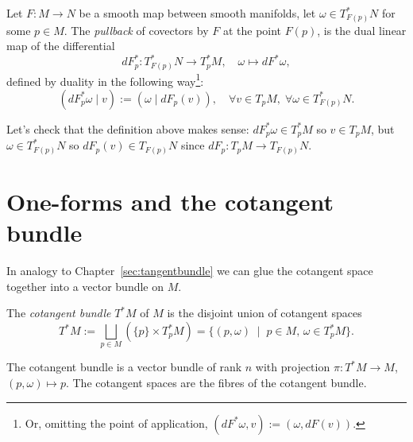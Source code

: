 \begin{definition}\label{def:pullback:oneform}
  Let $F:M\to N$ be a smooth map between smooth manifolds, let $\omega\in T^*_{F(p)}N$ for some $p\in M$.
  The \emph{pullback} of covectors by $F$ at the point $F(p)$, is the dual linear map of the differential
  \begin{equation}
    dF^*_p : T^*_{F(p)} N \to T^*_p M, \quad \omega \mapsto dF^*\omega,
  \end{equation}
  defined by duality in the following way\footnote{Or, omitting the point of application, $\left(dF^*\omega, v\right) := \left(\omega, dF(v)\right)$.}:
  \begin{equation}
    \left(dF^*_p\omega \mid v\right) := \left(\omega \mid dF_p(v)\right),\quad
    \forall v\in T_pM,\; \forall \omega\in T^*_{F(p)}N.
  \end{equation}
\end{definition}
\noindent Let's check that the definition above makes sense: $dF^*_p \omega \in T^*_p M$ so $v\in T_p M$, but $\omega\in T^*_{F(p)}N$ so $dF_p(v)\in T_{F(p)}N$ since $dF_p: T_pM\to T_{F(p)}N$.

\section{One-forms and the cotangent bundle}

In analogy to Chapter~\ref{sec:tangentbundle} we can glue the cotangent space together into a vector bundle on $M$.

\begin{definition}
  The \emph{cotangent bundle} $T^*M$ of $M$ is the disjoint union of cotangent spaces
  \begin{equation}
    T^*M := \bigsqcup_{p\in M}\left(\{p\}\times T^*_pM\right)
    = \{(p,\omega) \;\mid\; p\in M,\, \omega\in T^*_pM\}.
  \end{equation}
\end{definition}

The cotangent bundle is a vector bundle of rank $n$ with projection $\pi:T^*M\to M$, $(p,\omega)\mapsto p$.
The cotangent spaces are the fibres of the cotangent bundle.

